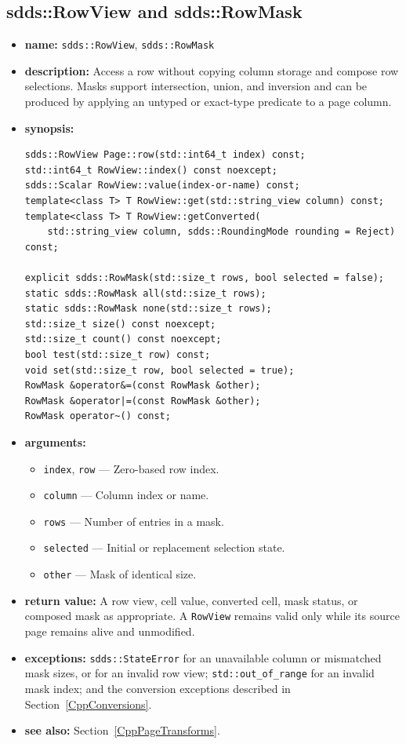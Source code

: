 \documentclass[11pt]{article}
\begin{document}
\subsection{sdds::RowView and sdds::RowMask}
\label{CppRowView}

\begin{itemize}
\item {\bf name:}\newline
{\tt sdds::RowView}, {\tt sdds::RowMask}
\item {\bf description:}\newline
Access a row without copying column storage and compose row selections.  Masks
support intersection, union, and inversion and can be produced by applying an
untyped or exact-type predicate to a page column.
\item {\bf synopsis:}
\begin{verbatim}
sdds::RowView Page::row(std::int64_t index) const;
std::int64_t RowView::index() const noexcept;
sdds::Scalar RowView::value(index-or-name) const;
template<class T> T RowView::get(std::string_view column) const;
template<class T> T RowView::getConverted(
    std::string_view column, sdds::RoundingMode rounding = Reject) const;

explicit sdds::RowMask(std::size_t rows, bool selected = false);
static sdds::RowMask all(std::size_t rows);
static sdds::RowMask none(std::size_t rows);
std::size_t size() const noexcept;
std::size_t count() const noexcept;
bool test(std::size_t row) const;
void set(std::size_t row, bool selected = true);
RowMask &operator&=(const RowMask &other);
RowMask &operator|=(const RowMask &other);
RowMask operator~() const;
\end{verbatim}
\item {\bf arguments:}
\begin{itemize}
\item {\tt index}, {\tt row} --- Zero-based row index.
\item {\tt column} --- Column index or name.
\item {\tt rows} --- Number of entries in a mask.
\item {\tt selected} --- Initial or replacement selection state.
\item {\tt other} --- Mask of identical size.
\end{itemize}
\item {\bf return value:}\newline
A row view, cell value, converted cell, mask status, or composed mask as
appropriate.  A {\tt RowView} remains valid only while its source page remains
alive and unmodified.
\item {\bf exceptions:}\newline
{\tt sdds::StateError} for an unavailable column or mismatched mask sizes,
or for an invalid row view; {\tt std::out\_of\_range} for an invalid mask
index; and the conversion exceptions described in
Section~\ref{CppConversions}.
\item {\bf see also:}\newline
Section~\ref{CppPageTransforms}.
\end{itemize}
\end{document}
